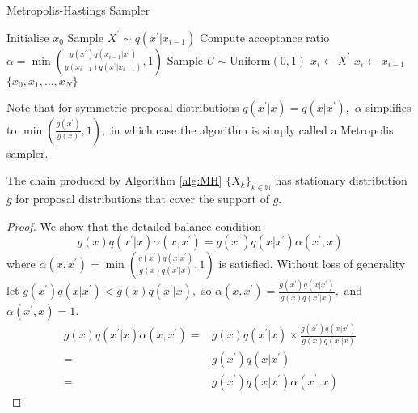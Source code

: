 \begin{algorithm}[htbp]
    \caption{Metropolis-Hastings Sampler}
    \label{alg:MH}
    \begin{algorithmic}[1]
        \State Initialise $x_0$
        \State Sample $X^\prime \sim q(x^\prime|x_{i - 1})$
        \State Compute acceptance ratio
        $\alpha
            = \min\left(
            \frac{
            g(x^\prime) q(x_{i - 1}|x^\prime)
            }{
            g(x_{i - 1}) q(x^\prime|x_{i - 1})
            },
            1
            \right)$
        \State Sample $U \sim \text{Uniform}(0, 1)$
        \State $x_i \gets X^\prime$
        \Else
        \State $x_i \gets x_{i-1}$
        \EndIf
        \EndFor
        \State \Return $\{x_0, x_1, \dots, x_N\}$
    \end{algorithmic}
\end{algorithm}

Note that for symmetric proposal distributions $q(x^\prime|x) = q(x|x^\prime),$
$\alpha$ simplifies to $\min\left(\frac{g(x^\prime)}{g(x)}, 1\right),$ in
which case the algorithm is simply called a Metropolis sampler.

\begin{theorem}
    The chain produced by Algorithm \ref{alg:MH} $\{X_k\}_{k\in \mathbb{N}}$
    has stationary distribution $g$ for proposal distributions that cover the
    support of $g.$
\end{theorem}

\begin{proof}
    We show that the detailed balance condition
    $$
        g(x)q(x^\prime | x)\alpha(x, x^\prime)
        =g(x^\prime)q(x | x^\prime)\alpha(x^\prime, x)
    $$
    where $\alpha(x, x^\prime) = \min\left(
        \frac{
                g(x^\prime) q(x|x^\prime)
            }{
                g(x) q(x^\prime|x)
            },
        1
        \right)$
    is satisfied. Without loss of generality let
    $g(x^\prime) q(x|x^\prime) < g(x) q(x^\prime|x),$ so
    $\alpha(x, x^\prime) = \frac{
            g(x^\prime) q(x|x^\prime)
        }{
            g(x) q(x^\prime|x)
        },$ and $\alpha(x^\prime, x) = 1.$
    \begin{align*}
        g(x)q(x^\prime | x)\alpha(x, x^\prime)
        = & g(x)q(x^\prime | x) \times \frac{
            g(x^\prime) q(x|x^\prime)
        }{
            g(x) q(x^\prime|x)
        }                                                \\
        = & g(x^\prime) q(x|x^\prime)                    \\
        = & g(x^\prime) q(x|x^\prime)\alpha(x^\prime, x)
    \end{align*}
\end{proof}

